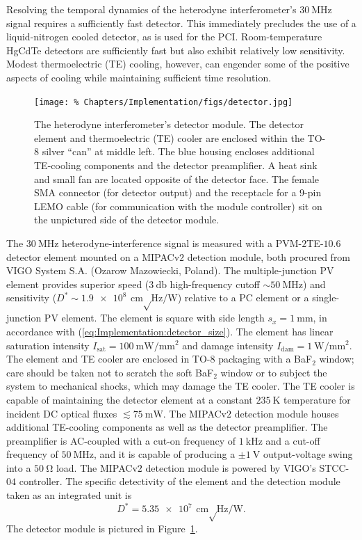 Resolving the temporal dynamics
of the heterodyne interferometer's $\SI{30}{\mega\hertz}$ signal
requires a sufficiently fast detector.
This immediately precludes the use of a liquid-nitrogen cooled detector,
as is used for the PCI.
Room-temperature HgCdTe detectors are sufficiently fast but
also exhibit relatively low sensitivity.
Modest thermoelectric (TE) cooling, however,
can engender some of the positive aspects of cooling while
maintaining sufficient time resolution.

\begin{figure}
  \centering
  \texttt{[image: \%
    Chapters/Implementation/figs/detector.jpg]}
  \caption[Detector module]{%
    The heterodyne interferometer's detector module.
    The detector element and thermoelectric (TE) cooler
    are enclosed within the TO-$8$ silver ``can'' at middle left.
    The blue housing encloses additional TE-cooling components and
    the detector preamplifier.
    A heat sink and small fan are located opposite of the detector face.
    The female SMA connector (for detector output) and
    the receptacle for a $9$-pin LEMO cable
    (for communication with the module controller)
    sit on the unpictured side of the detector module.
  }
\label{fig:Implementation:detector}
\end{figure}

The $\SI{30}{\mega\hertz}$ heterodyne-interference signal is measured with
a {PVM-$2$TE-$10.6$} detector element mounted on a MIPACv$2$ detection module,
both procured from VIGO System S.A. (Ozarow Mazowiecki, Poland).
The multiple-junction PV element provides superior speed
($\SI{3}{\decibel}$ high-frequency cutoff $\sim \SI{50}{\mega\hertz}$) and
sensitivity ($D^* \sim \SI{1.9e8}{\centi\meter \sqrt\hertz \per\watt}$)
relative to a PC element or a single-junction PV element.
The element is square with side length $s_x = \SI{1}{\milli\meter}$,
in accordance with (\ref{eq:Implementation:detector_size}).
The element has linear saturation intensity
$I_{\text{sat}} = \SI{100}{\milli\watt\per\milli\meter\squared}$ and
damage intensity
$I_{\text{dam}} = \SI{1}{\watt\per\milli\meter\squared}$.
The element and TE cooler are enclosed
in TO-$8$ packaging with a BaF$_2$ window;
care should be taken not to scratch the soft BaF$_2$ window or
to subject the system to mechanical shocks, which
may damage the TE cooler.
The TE cooler is capable of maintaining the detector element
at a constant $\SI{235}{\kelvin}$ temperature
for incident DC optical fluxes $\lesssim \SI{75}{\milli\watt}$.
The MIPACv$2$ detection module houses additional TE-cooling components
as well as the detector preamplifier.
The preamplifier is AC-coupled with
a cut-on frequency of $\SI{1}{\kilo\hertz}$ and
a cut-off frequency of $\SI{50}{\mega\hertz}$, and
it is capable of producing a $\pm\SI{1}{\volt}$
output-voltage swing into a $\SI{50}{\ohm}$ load.
The MIPACv$2$ detection module is powered by
VIGO's STCC-$04$ controller.
The specific detectivity of the element and the detection module
taken as an integrated unit is
\begin{equation}
  D^* = \SI{5.35e7}{\centi\meter \sqrt\hertz \per\watt}.
  \label{eq:Implementation:Dstar}
\end{equation}
The detector module is pictured in
Figure~\ref{fig:Implementation:detector}.


